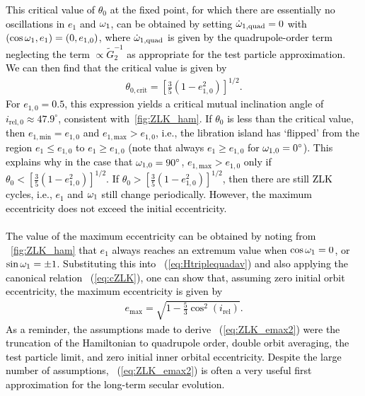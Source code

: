 \documentclass[main.tex]{subfiles}
\begin{document}
\begin{tcolorbox}[sharp corners, colback=green!30, colframe=green!80!blue, title=Box \ref{boxchap3:dynVI} -- Orbital dynamics VI (continued)]
\par \textcolor{black}{
This critical value of $\theta_0$ at the fixed point, for which there are essentially no oscillations in $e_1$ and $\omega_1$, can be obtained by setting $\dot{\omega}_{1,\mathrm{quad}} = 0$ with $(\cos\omega_1,e_1) = (0,e_{1,0})$, where $\dot{\omega}_{1,\mathrm{quad}}$ is given by the quadrupole-order term neglecting the term $\propto \tilde{G}_2^{-1}$ as appropriate for the test particle approximation. We can then find that the critical value is given by
\begin{align}
\theta_{0,\mathrm{crit}} = \left [\frac{3}{5} \left(1-e_{1,0}^2 \right) \right ]^{1/2}.
\end{align}
For $e_{1,0} = 0.5$, this expression yields a critical mutual inclination angle of $i_{\mathrm{rel},0} \approx 47.9^\circ$, consistent with \F\,\ref{fig:ZLK_ham}. If $\theta_0$ is less than the critical value, then $e_{1,\mathrm{min}} = e_{1,0}$ and $e_{1,\mathrm{max}} > e_{1,0}$, i.e., the libration island has `flipped' from the region $e_1 \leq e_{1,0}$ to $e_1 \geq e_{1,0}$ (note that always $e_1 \geq e_{1,0}$ for $\omega_{1,0} = 0^\circ$). This explains why in the case that $\omega_{1,0} = 90^\circ$, $e_{1,\mathrm{max}} > e_{1,0}$ only if $\theta_0 < \left [\frac{3}{5} \left(1-e_{1,0}^2 \right) \right ]^{1/2}$. If $\theta_0 > \left [\frac{3}{5} \left(1-e_{1,0}^2 \right) \right ]^{1/2}$, then there are still ZLK cycles, i.e., $e_1$ and $\omega_1$ still change periodically. However, the maximum eccentricity does not exceed the initial eccentricity. \\ \\
The value of the maximum eccentricity can be obtained by noting from \F~\ref{fig:ZLK_ham} that $e_1$ always reaches an extremum value when $\cos\omega_1=0$, or $\sin\omega_1 = \pm 1$. Substituting this into \Eq~(\ref{eq:Htriplequadav}) and also applying the canonical relation \Eq~(\ref{eq:cZLK}), one can show that, assuming zero initial orbit eccentricity, the maximum eccentricity is given by
\begin{align}
\label{eq:ZLK_emax2}
e_\mathrm{max} = \sqrt{1-\frac{5}{3}\cos^2 (i_\mathrm{rel})}.
\end{align}
As a reminder, the assumptions made to derive \Eq~(\ref{eq:ZLK_emax2}) were the truncation of the Hamiltonian to quadrupole order, double orbit averaging, the test particle limit, and zero initial inner orbital eccentricity. Despite the large number of assumptions, \Eq~(\ref{eq:ZLK_emax2}) is often a very useful first approximation for the long-term secular evolution.
}
\end{tcolorbox}
\end{document}
